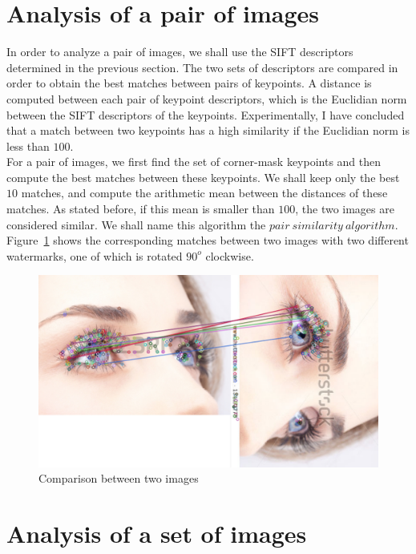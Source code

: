 \section{Analysis of a pair of images}

In order to analyze a pair of images, we shall use the SIFT descriptors determined in the previous section. The two sets of descriptors are compared in order to obtain the best matches between pairs of keypoints. A distance is computed between each pair of keypoint descriptors, which is the Euclidian norm between the SIFT descriptors of the keypoints. Experimentally, I have concluded that a match between two keypoints has a high similarity if the Euclidian norm is less than $100$.\\
For a pair of images, we first find the set of corner-mask keypoints and then compute the best matches between these keypoints. We shall keep only the best $10$ matches, and compute the arithmetic mean between the distances of these matches. As stated before, if this mean is smaller than $100$, the two images are considered similar. We shall name this algorithm the $pair\ similarity\ algorithm$.\\
Figure~\ref{fig:compareImages} shows the corresponding matches between two images with two different watermarks, one of which is rotated $90^o$ clockwise.

\begin{figure}[ht!]
\centering
\includegraphics[width=.8\linewidth]{images/compare.png}
\caption{Comparison between two images}
\label{fig:compareImages}
\end{figure}
 
 
\section{Analysis of a set of images}

